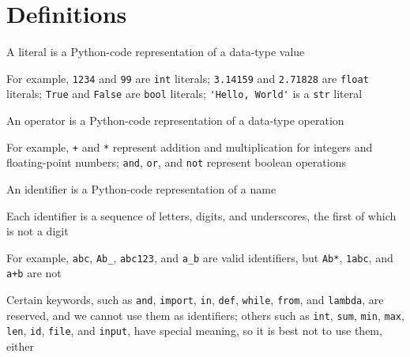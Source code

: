 \documentclass[8pt,a4paper,compress]{beamer}
\begin{document}
\section{Definitions}
\begin{frame}[fragile]
\pause

A literal is a Python-code representation of a data-type value

\pause
\bigskip

For example, \lstinline{1234} and \lstinline{99} are \lstinline{int} literals; \lstinline{3.14159} and \lstinline{2.71828} are \lstinline{float} literals; \lstinline{True} and \lstinline{False} are \lstinline{bool} literals; \lstinline{'Hello, World'} is a \lstinline{str} literal

\pause
\bigskip

An operator is a Python-code representation of a data-type operation

\pause
\bigskip

For example, \lstinline{+} and \lstinline{*} represent addition and multiplication for integers and floating-point numbers; \lstinline{and}, \lstinline{or}, and \lstinline{not} represent boolean operations

\pause
\bigskip

An identifier is a Python-code representation of a name

\pause
\bigskip

Each identifier is a sequence of letters, digits, and underscores, the first of which is not a digit

\pause
\bigskip

For example, \lstinline{abc}, \lstinline{Ab_}, \lstinline{abc123}, and \lstinline{a_b} are valid identifiers, but \lstinline{Ab*}, \lstinline{1abc}, and \lstinline{a+b} are not

\pause
\bigskip

Certain keywords, such as \lstinline{and}, \lstinline{import}, \lstinline{in}, \lstinline{def}, \lstinline{while}, \lstinline{from}, and \lstinline{lambda}, are reserved, and we cannot use them as identifiers; others such as \lstinline{int}, \lstinline{sum}, \lstinline{min}, \lstinline{max}, \lstinline{len}, \lstinline{id}, \lstinline{file}, and \lstinline{input}, have special meaning, so it is best not to use them, either
\end{frame}
\end{document}
